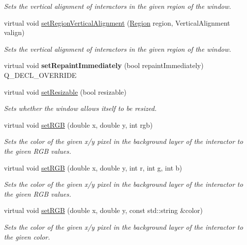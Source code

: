 \begin{DoxyCompactItemize}
\begin{DoxyCompactList}\small\item\em Sets the vertical alignment of interactors in the given region of the window. \end{DoxyCompactList}\item 
virtual void \mbox{\hyperlink{classGWindow_a1efb2d3b67fb479aad27a6c0032ee70e}{set\+Region\+Vertical\+Alignment}} (\mbox{\hyperlink{classGWindow_a81a01a86de31071a92e6cce0bab9bc4b}{Region}} region, Vertical\+Alignment valign)
\begin{DoxyCompactList}\small\item\em Sets the vertical alignment of interactors in the given region of the window. \end{DoxyCompactList}\item 
virtual void {\bfseries set\+Repaint\+Immediately} (bool repaint\+Immediately) Q\+\_\+\+D\+E\+C\+L\+\_\+\+O\+V\+E\+R\+R\+I\+DE
\item 
virtual void \mbox{\hyperlink{classGWindow_a8bf0c7d9f9aea44fa74f63a358df7d22}{set\+Resizable}} (bool resizable)
\begin{DoxyCompactList}\small\item\em Sets whether the window allows itself to be resized. \end{DoxyCompactList}\item 
virtual void \mbox{\hyperlink{classGDrawingSurface_a8bcbd65fa784bdab1e66a9efd381162d}{set\+R\+GB}} (double x, double y, int rgb)
\begin{DoxyCompactList}\small\item\em Sets the color of the given x/y pixel in the background layer of the interactor to the given R\+GB values. \end{DoxyCompactList}\item 
virtual void \mbox{\hyperlink{classGDrawingSurface_a81202471d4fc9f2015aef0bc073acfab}{set\+R\+GB}} (double x, double y, int r, int g, int b)
\begin{DoxyCompactList}\small\item\em Sets the color of the given x/y pixel in the background layer of the interactor to the given R\+GB values. \end{DoxyCompactList}\item 
virtual void \mbox{\hyperlink{classGDrawingSurface_ae9a228792d4bb4b628350f39eaa3ad12}{set\+R\+GB}} (double x, double y, const std\+::string \&color)
\begin{DoxyCompactList}\small\item\em Sets the color of the given x/y pixel in the background layer of the interactor to the given color. \end{DoxyCompactList}\item 

\end{DoxyCompactItemize}
